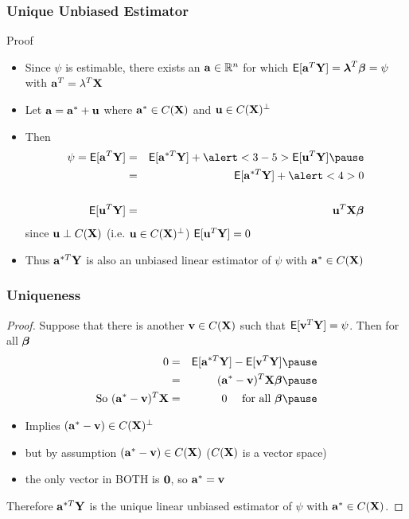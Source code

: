 \documentclass{beamer}
\begin{document}
  \begin{frame}
 \frametitle{Unique Unbiased Estimator}
  \begin{block}{Proof}
    \begin{itemize}
    \item     Since $\psi$ is estimable, there exists an $\mathbf{a} \in \mathbb{R}^n$ for
    which $\textsf{E}[\mathbf{a}^T\mathbf{Y}] = \boldsymbol{\lambda}^T\boldsymbol{\beta} = \psi$  with $\mathbf{a}^T =
    \lambda^T\mathbf{X}$ \pause
\item Let $\mathbf{a} = \mathbf{a}^* + \mathbf{u}$ where $\mathbf{a}^* \in C(\mathbf{X})$ and $\mathbf{u} \in
  C(\mathbf{X})^\perp$ \pause
\item Then
  \begin{eqnarray*}
\psi  =   \E[\a^T\Y] &=& \E[\a^{*T}\Y] + \alert<3-5>{\E[\u^T\Y]} \pause\\    
     & = & \E[\a^{*T} \Y] + \alert<4>{0} \\
  &  & \\
\E[\u^T\Y] & = & \u^T\X \b
  \end{eqnarray*} 
since $\mathbf{u} \perp C(\mathbf{X})$ (i.e. $\mathbf{u} \in C(\mathbf{X})^\perp$) $\textsf{E}[\mathbf{u}^T\mathbf{Y}] = 0$ \pause

\item Thus $\mathbf{a}^{*T} \mathbf{Y}$ is also an unbiased linear estimator of $\psi$ with
  $\mathbf{a}^* \in C(\mathbf{X})$
    \end{itemize}

  \end{block}
\end{frame}
\begin{frame}
  \frametitle{Uniqueness}
  \begin{proof}
  Suppose that there is another $\mathbf{v} \in C(\mathbf{X})$ such that $\textsf{E}[\mathbf{v}^T\mathbf{Y}] =
  \psi$. Then for all $\boldsymbol{\beta}$ \pause
  \begin{eqnarray*}
    0 & = & \E[\a^{*T}\Y] - \E[\v^T\Y]  \pause \\
      & = & (\a^* - \v)^T \X \b \pause\\
\text{So  } (\a^* - \v)^T\X & = &  0 \quad \text{ for all } \b \pause
  \end{eqnarray*}

\begin{itemize}
\item Implies $(\mathbf{a}^* - \mathbf{v}) \in C(\mathbf{X})^\perp$ \pause
\item but by assumption $(\mathbf{a}^* - \mathbf{v}) \in C(\mathbf{X})$ \pause ($C(\mathbf{X})$ is a
  vector space) \pause
\item the only vector in BOTH is $\mathbf{0}$, so $\mathbf{a}^* = \mathbf{v}$ \pause
\end{itemize}
Therefore $\mathbf{a}^{*T}\mathbf{Y}$ is the unique linear unbiased estimator of $\psi$
with $\mathbf{a}^* \in C(\mathbf{X})$.
  \end{proof}

\end{frame}
\end{document}
